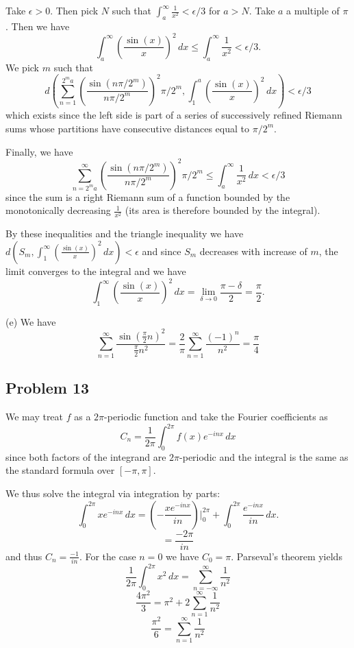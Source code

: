 \documentclass{amsart}
\begin{document}
\medskip \noindent Take $\epsilon>0$. Then pick $N$ such that $\int_a^\infty \frac{1}{x^2}<\epsilon/3$ for $a>N$. Take $a$ a multiple of $\pi$. Then we have \[\int_a^\infty \left(\frac{\sin(x)}{x}\right)^2\,dx\leq\int_a^\infty\frac{1}{x^2}<\epsilon/3.\] We pick $m$ such that \[d\left(\sum_{n=1}^{2^ma}\left(\frac{\sin(n\pi/2^m)}{n\pi/2^m}\right)^2\pi/2^m, \int_1^a\left(\frac{\sin(x)}{x}\right)^2\,dx\right)<\epsilon/3\] which exists since the left side is part of a series of successively refined Riemann sums whose partitions have consecutive distances equal to $\pi/2^m$. 

\medskip \noindent Finally, we have \[\sum_{n=2^ma}^\infty\left(\frac{\sin(n\pi/2^m)}{n\pi/2^m}\right)^2\pi/2^m \leq \int_a^\infty\frac{1}{x^2}\,dx<\epsilon/3\] since the sum is a right Riemann sum of a function bounded by the monotonically decreasing $\frac{1}{x^2}$ (its area is therefore bounded by the integral).

\medskip \noindent By these inequalities and the triangle inequality we have $d\left(S_m, \int_1^\infty\left(\frac{\sin(x)}{x}\right)^2\,dx\right)<\epsilon$ and since $S_m$ decreases with increase of $m$, the limit converges to the integral and we have 
\[\int_1^\infty\left(\frac{\sin(x)}{x}\right)^2\,dx = \lim_{\delta\to 0} \frac{\pi-\delta}{2}=\frac{\pi}{2}.\]

\medskip \noindent (e) We have \[\sum_{n=1}^\infty\frac{\sin(\frac{\pi}{2} n)^2}{\frac{\pi}{2} n^2} = \frac{2}{\pi}\sum_{n=1}^\infty \frac{(-1)^n}{n^2} = \frac{\pi}{4}\]

\subsection*{Problem 13} 
We may treat $f$ as a $2\pi$-periodic function and take the Fourier coefficients as \[C_n=\frac{1}{2\pi}\int_0^{2\pi} f(x)e^{-inx}\,dx\] since both factors of the integrand are $2\pi$-periodic and the integral is the same as the standard formula over $[-\pi, \pi]$.

We thus solve the integral via integration by parts: \[\int_0^{2\pi}xe^{-inx}\,dx=
\left(-\frac{xe^{-inx}}{in}\right)\Bigg|_0^{2\pi}+\int_0^{2\pi}\frac{e^{-inx}}{in}\,dx.\]
\[=\frac{-2\pi}{in}\] and thus $C_n=\frac{-1}{in}$. For the case $n=0$ we have $C_0=\pi$. Parseval's theorem yields 
\[\frac{1}{2\pi}\int_0^{2\pi} x^2\,dx = \sum_{n=-\infty}^\infty\frac{1}{n^2}\]
\[\frac{4\pi^2}{3}=\pi^2+2\sum_{n=1}^\infty\frac{1}{n^2}\]
\[\frac{\pi^2}{6}=\sum_{n=1}^\infty\frac{1}{n^2}\]
\end{document}
